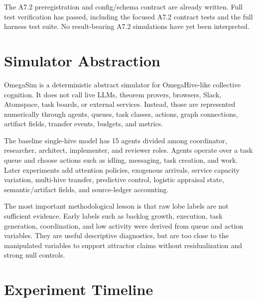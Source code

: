 \documentclass[11pt]{article}
\begin{document}
The A7.2 preregistration and config/schema contract are already written. Full
test verification has passed, including the focused A7.2 contract tests and
the full harness test suite. No result-bearing A7.2 simulations have yet been
interpreted.

\section{Simulator Abstraction}

OmegaSim is a deterministic abstract simulator for OmegaHive-like collective
cognition. It does not call live LLMs, theorem provers, browsers, Slack,
Atomspace, task boards, or external services. Instead, those are represented
numerically through agents, queues, task classes, actions, graph connections,
artifact fields, transfer events, budgets, and metrics.

The baseline single-hive model has 15 agents divided among coordinator,
researcher, architect, implementer, and reviewer roles. Agents operate over a
task queue and choose actions such as idling, messaging, task creation, and
work. Later experiments add attention policies, exogenous arrivals, service
capacity variation, multi-hive transfer, predictive control, logistic appraisal
state, semantic/artifact fields, and source-ledger accounting.

The most important methodological lesson is that raw lobe labels are not
sufficient evidence. Early labels such as backlog growth, execution,
task generation, coordination, and low activity were derived from queue and
action variables. They are useful descriptive diagnostics, but are too close to
the manipulated variables to support attractor claims without residualization
and strong null controls.

\section{Experiment Timeline}
\end{document}
